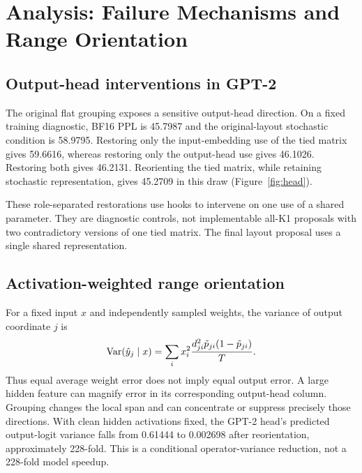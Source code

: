 \documentclass[11pt]{article}
\begin{document}
\section{Analysis: Failure Mechanisms and Range Orientation}
\subsection{Output-head interventions in GPT-2}
The original flat grouping exposes a sensitive output-head direction. On a fixed training diagnostic, BF16 PPL is 45.7987 and the original-layout stochastic condition is 58.9795. Restoring only the input-embedding use of the tied matrix gives 59.6616, whereas restoring only the output-head use gives 46.1026. Restoring both gives 46.2131. Reorienting the tied matrix, while retaining stochastic representation, gives 45.2709 in this draw (Figure~\ref{fig:head}).

These role-separated restorations use hooks to intervene on one use of a shared parameter. They are diagnostic controls, not implementable all-K1 proposals with two contradictory versions of one tied matrix. The final layout proposal uses a single shared representation.


\subsection{Activation-weighted range orientation}
For a fixed input $x$ and independently sampled weights, the variance of output coordinate $j$ is
\begin{equation}
 \operatorname{Var}(\hat y_j\mid x)=\sum_i x_i^2\frac{d_{ji}^2\tilde p_{ji}(1-\tilde p_{ji})}{T}.
 \label{eq:outvar}
\end{equation}
Thus equal average weight error does not imply equal output error. A large hidden feature can magnify error in its corresponding output-head column. Grouping changes the local span and can concentrate or suppress precisely those directions. With clean hidden activations fixed, the GPT-2 head's predicted output-logit variance falls from 0.61444 to 0.002698 after reorientation, approximately 228-fold. This is a conditional operator-variance reduction, not a 228-fold model speedup.
\end{document}
